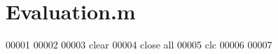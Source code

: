 \hypertarget{_evaluation_8m_source}{}\section{Evaluation.\+m}
\label{_evaluation_8m_source}

\begin{DoxyCode}
00001 %
00002 
00003 clear 
00004 close all 
00005 clc
00006 
00007 
\end{DoxyCode}
